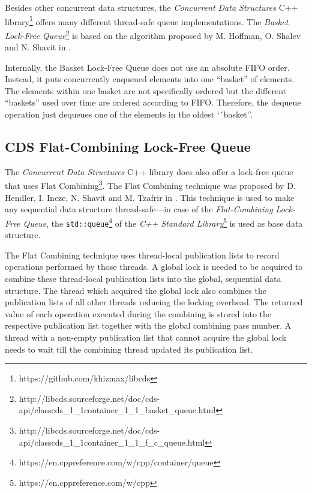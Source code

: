 	Besides other concurrent data structures, the \textit{Concurrent Data Structures} C++ library\footnote{https://github.com/khizmax/libcds} offers many different thread-safe queue implementations. The \emph{Basket Lock-Free Queue}\footnote{http://libcds.sourceforge.net/doc/cds-api/classcds\_1\_1container\_1\_1\_basket\_queue.html} is based on the algorithm proposed by M. Hoffman, O. Shalev and N. Shavit in \cite{Hoffman:2007}.
	
	Internally, the Basket Lock-Free Queue does not use an absolute FIFO order. Instead, it puts concurrently enqueued elements into one ``basket'' of elements. The elements within one basket are not specifically ordered but the different ``baskets'' used over time are ordered according to FIFO. Therefore, the dequeue operation just dequeues one of the elements in the oldest `´basket''.

\subsection[CDS FCQueue]{CDS Flat-Combining Lock-Free Queue} \label{subsec:cds-fc}

	The \textit{Concurrent Data Structures} C++ library does also offer a lock-free queue that uses Flat Combining\footnote{http://libcds.sourceforge.net/doc/cds-api/classcds\_1\_1container\_1\_1\_f\_c\_queue.html}. The Flat Combining technique was proposed by D. Hendler, I. Incze, N. Shavit and M. Tzafrir in \cite{Hendler:2010}.  This technique is used to make any sequential data structure thread-safe---in case of the \emph{Flat-Combining Lock-Free Queue}, the \lstinline{std::queue}\footnote{https://en.cppreference.com/w/cpp/container/queue} of the \textit{C++ Standard Library}\footnote{https://en.cppreference.com/w/cpp} is used as base data structure.
	
	The Flat Combining technique uses thread-local publication lists to record operations performed by those threads. A global lock is needed to be acquired to combine these thread-local publication lists into the global, sequential data structure. The thread which acquired the global lock also combines the publication lists of all other threads reducing the locking overhead. The returned value of each operation executed during the combining is stored into the respective publication list together with the global combining pass number. A thread with a non-empty publication list that cannot acquire the global lock needs to wait till the combining thread updated its publication list.

